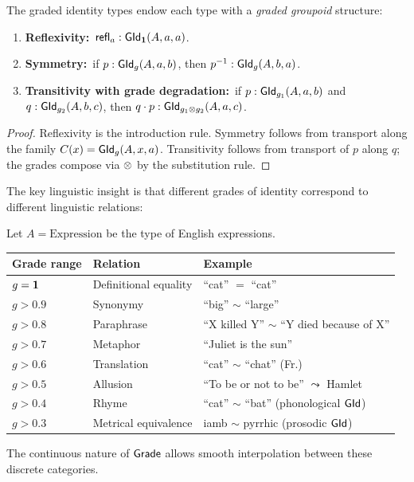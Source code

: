 \begin{proposition}
\label{prop:graded-groupoid}
The graded identity types endow each type with a \emph{graded
groupoid} structure:
\begin{enumerate}[label=(\roman*)]
\item \textbf{Reflexivity:}\ $\mathsf{refl}_a : \mathsf{GId}_{\mathbf{1}}(A,a,a)$.
\item \textbf{Symmetry:}\ if $p : \mathsf{GId}_g(A,a,b)$, then
  $p^{-1} : \mathsf{GId}_g(A,b,a)$.
\item \textbf{Transitivity with grade degradation:}\ if
  $p : \mathsf{GId}_{g_1}(A,a,b)$ and $q : \mathsf{GId}_{g_2}(A,b,c)$, then
  $q \cdot p : \mathsf{GId}_{g_1 \otimes g_2}(A,a,c)$.
\end{enumerate}
\end{proposition}

\begin{proof}
Reflexivity is the introduction rule.  Symmetry follows from
transport along the family $C(x) = \mathsf{GId}_g(A, x, a)$.  Transitivity
follows from transport of $p$ along $q$; the grades compose via
$\otimes$ by the substitution rule.
\end{proof}

The key linguistic insight is that different grades of identity
correspond to different linguistic relations:

\begin{example}
\label{ex:identity-spectrum}
Let $A = \mathrm{Expression}$ be the type of English expressions.
\begin{center}
\renewcommand{\arraystretch}{1.2}
\begin{tabular}{lll}
\textbf{Grade range} & \textbf{Relation} & \textbf{Example} \\
\hline
$g = \mathbf{1}$ & Definitional equality & ``cat'' $=$ ``cat'' \\
$g > 0.9$ & Synonymy & ``big'' $\sim$ ``large'' \\
$g > 0.8$ & Paraphrase & ``X killed Y'' $\sim$ ``Y died because of X'' \\
$g > 0.7$ & Metaphor & ``Juliet is the sun'' \\
$g > 0.6$ & Translation & ``cat'' $\sim$ ``chat'' (Fr.) \\
$g > 0.5$ & Allusion & ``To be or not to be'' $\leadsto$ Hamlet \\
$g > 0.4$ & Rhyme & ``cat'' $\sim$ ``bat'' (phonological $\mathsf{GId}$) \\
$g > 0.3$ & Metrical equivalence & iamb $\sim$ pyrrhic (prosodic $\mathsf{GId}$) \\
\end{tabular}
\end{center}
The continuous nature of $\mathsf{Grade}$ allows smooth interpolation
between these discrete categories.
\end{example}

